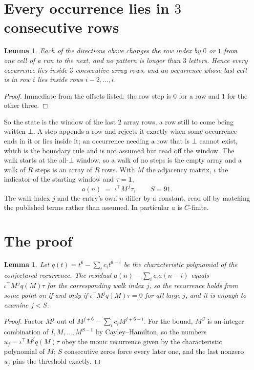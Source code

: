 \documentclass[11pt,a4paper]{article}
\theoremstyle{plain}
\newtheorem{lemma}[theorem]{Lemma}
\theoremstyle{definition}
\begin{document}
\section{Every occurrence lies in $3$ consecutive rows}

\begin{lemma}\label{lem:win}
Each of the directions above changes the row index by $0$ or $1$ from one cell of a run to the
next, and no pattern is longer than $3$ letters. Hence every occurrence lies inside $3$
consecutive array rows, and an occurrence whose last cell is in row $i$ lies inside rows
$i-2,\dots,i$.
\end{lemma}

\begin{proof}
Immediate from the offsets listed: the row step is $0$ for a row and $1$ for the other three.
\end{proof}

So the state is the window of the last $2$ array rows, a row still to come being written
$\bot$. A step appends a row and rejects it exactly when some occurrence ends in it or lies
inside it; an occurrence needing a row that is $\bot$ cannot exist, which is the boundary rule
and is not assumed but read off the window. The walk starts at the all-$\bot$ window, so a walk
of no steps is the empty array and a walk of $R$ steps is an array of $R$ rows. With $M$ the
adjacency matrix, $\iota$ the indicator of the starting window and $\tau=\mathbf{1}$,
\[
a(n)\;=\;\iota^{\!\top}M^{\,j}\tau ,\qquad S=91.
\]
The walk index $j$ and the entry's own $n$ differ by a constant, read off by matching the
published terms rather than assumed. In particular $a$ is $C$-finite.

\section{The proof}

\begin{lemma}\label{lem:crit}
Let $q(t)=t^{6}-\sum_i c_it^{6-i}$ be the characteristic polynomial of the
conjectured recurrence. The residual $a(n)-\sum_ic_ia(n-i)$ equals
$\iota^{\!\top}M^{\,j}q(M)\tau$ for the corresponding walk index $j$, so the recurrence
holds from some point on if and only if $\iota^{\!\top}M^{j}q(M)\tau=0$ for all large $j$,
and it is enough to examine $j<S$.
\end{lemma}

\begin{proof}
Factor $M^{j}$ out of $M^{j+6}-\sum_ic_iM^{j+6-i}$. For the bound, $M^{S}$
is an integer combination of $I,M,\dots,M^{S-1}$ by Cayley--Hamilton, so the numbers
$u_j=\iota^{\!\top}M^{j}q(M)\tau$ obey the monic recurrence given by the characteristic
polynomial of $M$; $S$ consecutive zeros force every later one, and the last nonzero $u_j$
pins the threshold exactly.
\end{proof}
\end{document}
